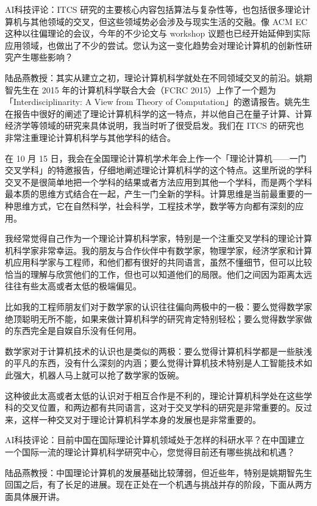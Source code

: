 AI科技评论：ITCS 研究的主要核心内容包括算法与复杂性等，也包括很多理论计算机与其他领域的交叉，但这些领域势必会涉及与现实生活的交融。像 ACM EC 这种以往偏理论的会议，今年的不少论文与 workshop 议题也已经开始延伸到实际应用领域，也做出了不少的尝试。您认为这一变化趋势会对理论计算机的创新性研究产生哪些影响？

陆品燕教授：其实从建立之初，理论计算机科学就处在不同领域交叉的前沿。姚期智先生在 2015 年的计算机科学联合大会（FCRC 2015）上作了一个题为「Interdisciplinarity: A View from Theory of Computation」的邀请报告。姚先生在报告中很好的阐述了理论计算机科学的这一特点，并以他自己在量子计算、计算经济学等领域的研究来具体说明，我当时听了很受启发。我们在 ITCS 的研究也非常注重理论计算机科学与其他学科的结合。

在 10 月 15 日，我会在全国理论计算机学术年会上作一个「理论计算机——一门交叉学科」的特邀报告，仔细地阐述理论计算机科学的这个特点。这里所说的学科交叉不是很简单地把一个学科的结果或者方法应用到其他一个学科，而是两个学科最本质的思维方式结合在一起，产生一门全新的学科。计算思维是当前最重要的一种思维方式，它在自然科学，社会科学，工程技术学，数学等方向都有深刻的应用。

我经常觉得自己作为一个理论计算机科学家，特别是一个注重交叉学科的理论计算机科学家非常幸运。我的朋友与合作伙伴中有数学家，物理学家，经济学家和计算机应用科学家与工程师，和他们都有很好的共同语言，虽然不懂细节，但可以比较恰当的理解与欣赏他们的工作，但也可以知道他们的局限。他们之间因为距离太远往往有些太高或者太低的极端偏见。

比如我的工程师朋友们对于数学家的认识往往偏向两极中的一极：要么觉得数学家绝顶聪明无所不能，如果来做计算机科学的研究肯定特别轻松；要么觉得数学家做的东西完全是自娱自乐没有任何用。

数学家对于计算机技术的认识也是类似的两极：要么觉得计算机科学都是一些肤浅的平凡的东西，没有什么深刻的内涵；要么觉得计算机技术特别是人工智能技术如此强大，机器人马上就可以抢了数学家的饭碗。

这种彼此太高或者太低的认识对于相互合作是不利的，理论计算机科学处在这些学科的交叉位置，和两边都有共同语言，这对于交叉学科的研究是非常重要的。反过来，这样一种交叉对于理论计算机科学本身的发展也是非常重要的。

AI科技评论：目前中国在国际理论计算机领域处于怎样的科研水平？在中国建立一个国际一流的理论计算机科学研究中心，您觉得目前还有哪些挑战和机遇？

陆品燕教授：中国理论计算机的发展基础比较薄弱，但近些年，特别是姚期智先生回国之后，有了长足的进展。现在正处在一个机遇与挑战并存的阶段，下面从两方面具体展开讲。

